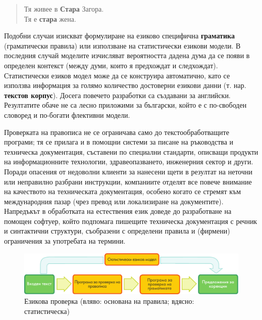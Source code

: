 \documentclass[]{../../metanetpaper}
\begin{document}
\begin{multicols}{2}
\begin{quote}
  Тя живее в \textbf{Стара} Загора.\\
  Тя е \textbf{стара} жена.
\end{quote}

Подобни случаи изискват формулиране на езиково специфична \textbf{граматика} (граматически правила) или използване на статистически езикови модели. В последния случай моделите изчисляват вероятността дадена дума да се появи в определен контекст (между думи, които я предхождат и следхождат). 
Статистически езиков модел може да се конструира автоматично, като се използва информация за голямо количество достоверни езикови данни (т. нар. \textbf{текстов корпус}). Досега повечето разработки са създавани за английски. Резултатите обаче не са лесно приложими за български, който е с по-свободен словоред и по-богати флективни модели. 

Проверката на правописа не се ограничава само до текстообработващите програми; тя се прилага и в помощни системи за писане на ръководства и техническа документация, съставени по специални стандарти, описващи продукти на информационните технологии, здравеопазването, инженерния сектор и други. 
Поради опасения от недоволни клиенти за нанесени щети в резултат на неточни или неправилно разбрани инструкции, компаниите отделят все повече внимание на качеството на техническата документация, особено когато се стремят към международния пазар (чрез превод или локализиране на документите).
Напредъкът в обработката на естествения език доведе до разработване на помощен софтуер, който подпомага пишещите техническа документация с речник и синтактични структури, съобразени с определени правила и (фирмени) ограничения за употребата на термини. 

\begin{figure}[htb]
  \center
  \includegraphics[width=\textwidth]{../_media/bulgarian/language_checking}
  \caption{Езикова проверка (вляво: основана на правила; вдясно: статистическа)}
  \label{fig:langcheckingaarch_de}
\end{figure}


\end{multicols}
\end{document}
